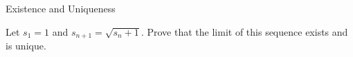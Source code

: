Existence and Uniqueness



Let $s_1=1$ and $s_{n+1}=\sqrt{s_n+1}$.  Prove that the limit of this sequence exists and is unique.

